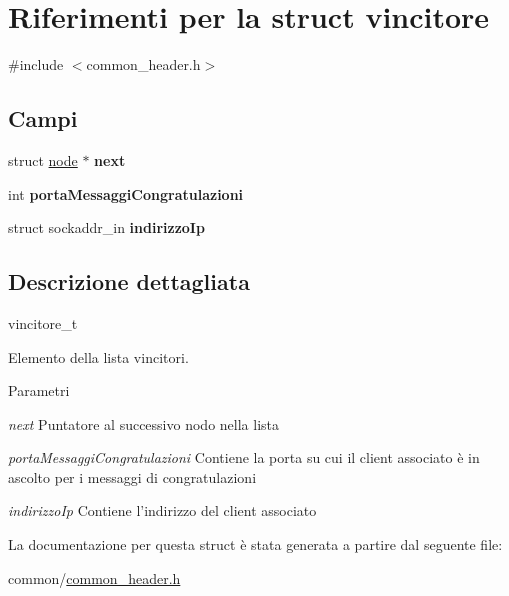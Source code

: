 \hypertarget{structvincitore}{
\section{Riferimenti per la struct vincitore}
\label{structvincitore}
}


{\ttfamily \#include $<$common\_\-header.h$>$}

\subsection*{Campi}
\begin{DoxyCompactItemize}
\item 
\hypertarget{structvincitore_a248f15d37188565198afd96f08acce50}{
struct \hyperlink{structnode__tag}{node} $\ast$ {\bfseries next}}
\label{structvincitore_a248f15d37188565198afd96f08acce50}

\item 
\hypertarget{structvincitore_a91f572ef178188d90ed8c1c0185b3a06}{
int {\bfseries portaMessaggiCongratulazioni}}
\label{structvincitore_a91f572ef178188d90ed8c1c0185b3a06}

\item 
\hypertarget{structvincitore_af62a5a91df27a3d030f3d45d8312f9d4}{
struct sockaddr\_\-in {\bfseries indirizzoIp}}
\label{structvincitore_af62a5a91df27a3d030f3d45d8312f9d4}

\end{DoxyCompactItemize}


\subsection{Descrizione dettagliata}
vincitore\_\-t

Elemento della lista vincitori. 
\begin{DoxyParams}{Parametri}
\item[{\em next}]Puntatore al successivo nodo nella lista \item[{\em portaMessaggiCongratulazioni}]Contiene la porta su cui il client associato è in ascolto per i messaggi di congratulazioni \item[{\em indirizzoIp}]Contiene l'indirizzo del client associato \end{DoxyParams}


La documentazione per questa struct è stata generata a partire dal seguente file:\begin{DoxyCompactItemize}
\item 
common/\hyperlink{common__header_8h}{common\_\-header.h}\end{DoxyCompactItemize}
